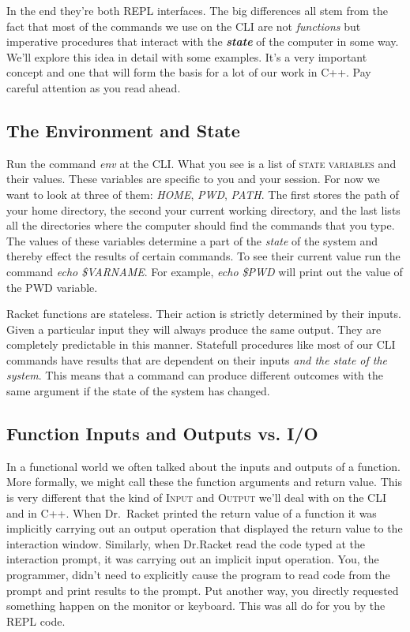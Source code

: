 \documentclass[nobib]{tufte-handout}
\begin{document}
In the end they're both REPL interfaces.  The big differences all stem from the fact that most of the commands we use on the CLI are not \textit{functions} but imperative procedures that interact with the \textit{\textbf{state}} of the computer in some way. We'll explore this idea in detail with some examples. It's a very important concept and one that will form the basis for a lot of our work in C++. Pay careful attention as you read ahead.

\subsection{The Environment and State}

Run the command \textit{env} at the CLI\@.  What you see is a list of \textsc{state variables} and their values. These variables are specific to you and your session. For now we want to look at three of them: \textit{HOME}, \textit{PWD}, \textit{PATH}. The first stores the path of your home directory, the second your current working directory, and the last lists all the directories where the computer should find the commands that you type. The values of these variables determine a part of the \textit{state} of the system and thereby effect the results of certain commands. To see their current value run the command \textit{echo \$VARNAME}. For example, \textit{echo \$PWD} will print out the value of the PWD variable.

Racket functions are stateless. Their action is strictly determined by their inputs. Given a particular input they will always produce the same output. They are completely predictable in this manner. Statefull procedures like most of our CLI commands have results that are dependent on their inputs \textit{and the state of the system}. This means that a command can produce different outcomes with the same argument if the state of the system has changed.

\subsection{Function Inputs and Outputs vs. I/O}

In a functional world we often talked about the inputs and outputs of a function. More formally, we might call these the function arguments and return value. This is very different that the kind of \textsc{Input} and \textsc{Output} we'll deal with on the CLI and in C++.  When Dr.\ Racket printed the return value of a function it was implicitly carrying out an output operation that displayed the return value to the interaction window. Similarly, when Dr.Racket read the code typed at the interaction prompt, it was carrying out an implicit input operation.  You, the programmer, didn't need to explicitly cause the program to read code from the prompt and print results to the prompt. Put another way, you directly requested something happen on the monitor or keyboard. This was all do for you by the REPL code.
\end{document}
